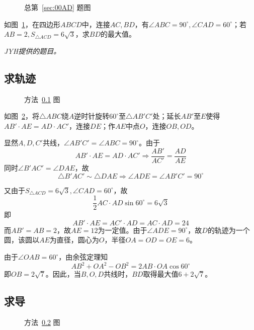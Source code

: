 

\begin{figure}[htbp]
  \centering {}
  \caption{总第~\ref{sec:00AD} 题图} \label{fig:00AD}
\end{figure}

如图~\ref{fig:00AD}，在四边形$ABCD$中，连接$AC, BD$，有$\angle ABC = 90^\circ, \angle CAD = 60^\circ$；若$AB = 2, S_{\triangle ACD} = 6\sqrt3$，求$BD$的最大值。

\emph{JYH提供的题目。}


\subsection{求轨迹} \label{subsec:00AD-l}

\begin{figure}[htbp]
  \centering {}
  \caption{方法~\ref{subsec:00AD-l} 图} \label{fig:00AD-l}
\end{figure}

如图~\ref{fig:00AD-l}，将$\triangle ABC$绕$A$逆时针旋转$60^\circ$至$\triangle AB'C'$处；延长$AB'$至$E$使得$AB' \cdot AE = AD \cdot AC'$，连接$DE$；作$AE$中点$O$，连接$OB, OD$。

显然$A, D, C'$共线，$\angle AB'C' = \angle ABC = 90^\circ$。由于
\[ AB' \cdot AE = AD \cdot AC' \Rightarrow \frac{AB'}{AC'} = \frac{AD}{AE} \]
同时$\angle B'AC' = \angle DAE$，故
\[ \triangle B'AC' \sim \triangle DAE \Rightarrow \angle ADE = \angle AB'C' = 90^\circ \]

又由于$S_{\triangle ACD} = 6\sqrt3, \angle CAD = 60^\circ$，故
\[ \frac12 AC \cdot AD \sin 60^\circ = 6\sqrt3 \]
即
\[ AB' \cdot AE = AC' \cdot AD = AC \cdot AD = 24 \]
而$AB' = AB = 2$，故$AE = 12$为一定值。由于$\angle ADE = 90^\circ$，故$D$的轨迹为一个圆，该圆以$AE$为直径，圆心为$O$，半径$OA = OD = OE = 6$。

由于$\angle OAB = 60^\circ$，由余弦定理知
\[ AB^2 + OA^2 - OB^2 = 2 AB \cdot OA \cos 60^\circ \]
即$OB = 2\sqrt7$。因此，当$B, O, D$共线时，$BD$取得最大值$6 + 2\sqrt7$。

\subsection{求导} \label{subsec:00AD-d}

\begin{figure}[htbp]
  \centering {}
  \caption{方法~\ref{subsec:00AD-d} 图} \label{fig:00AD-d}
\end{figure}

